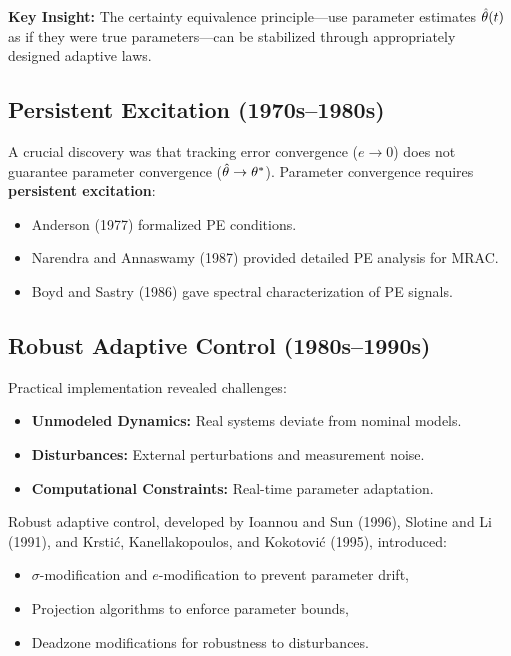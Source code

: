 \textbf{Key Insight:} The certainty equivalence principle—use parameter estimates $\hat{\theta}(t)$ as if they were true parameters—can be stabilized through appropriately designed adaptive laws.

\subsection{Persistent Excitation (1970s--1980s)}

A crucial discovery was that tracking error convergence ($e \to 0$) does not guarantee parameter convergence ($\hat{\theta} \to \theta^*$). Parameter convergence requires \textbf{persistent excitation}:
\begin{itemize}
    \item Anderson (1977) formalized PE conditions.
    \item Narendra and Annaswamy (1987) provided detailed PE analysis for MRAC.
    \item Boyd and Sastry (1986) gave spectral characterization of PE signals.
\end{itemize}

\subsection{Robust Adaptive Control (1980s--1990s)}

Practical implementation revealed challenges:
\begin{itemize}
    \item \textbf{Unmodeled Dynamics:} Real systems deviate from nominal models.
    \item \textbf{Disturbances:} External perturbations and measurement noise.
    \item \textbf{Computational Constraints:} Real-time parameter adaptation.
\end{itemize}

Robust adaptive control, developed by Ioannou and Sun (1996), Slotine and Li (1991), and Krstić, Kanellakopoulos, and Kokotović (1995), introduced:
\begin{itemize}
    \item $\sigma$-modification and $e$-modification to prevent parameter drift,
    \item Projection algorithms to enforce parameter bounds,
    \item Deadzone modifications for robustness to disturbances.
\end{itemize}

